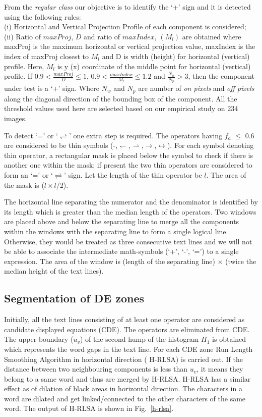 \documentclass[oneside,a4paper,12pt]{book}
\begin{document}
From the \emph{regular class} our objective is to identify the `+' sign
and it is detected using the following rules: \\
(i)  Horizontal and Vertical Projection Profile of each component is considered;\\
(ii) Ratio of  $maxProj$, $D$ and ratio of $maxIndex$, $(M_l)$
are obtained where maxProj is the maximum horizontal or vertical projection value, maxIndex is the index of maxProj closest to $M_l$ and D is width (height) for horizontal (vertical) profile. Here, $M_l$ is y (x) coordinate of the middle point for  horizontal (vertical) profile. 
If  $0.9 < \frac{maxProj}{D} \leq 1$,  $0.9 < \frac{maxIndex}{M_l} \leq 1.2$ and $\frac{N_w}{N_p} > 3$, then the component under test is a `+' sign.
Where $N_w$ and $N_p$ are number of \emph{on pixels} and \emph{off pixels} along the 
diagonal direction of the bounding box of the component. All the threshold values used  here are selected based on our empirical study on 234 images.


To detect `=' or `$\rightleftharpoons$' one extra step is required. 
The operators having $f_a$ $\leq$ 0.6 are considered to be thin symbols (-,$\leftharpoondown$,$\rightharpoonup$,$\rightarrow$,$\leftrightarrow$). 
 For each symbol denoting thin operator, a rectangular mask is placed below the
symbol to check if there is another one within the mask; if present the two thin operators are considered to form
an `=' or `$\rightleftharpoons$' sign. Let the length of the thin operator be $l$. The area of the  mask is  ($l \times l/2$).

The horizontal line separating  the numerator and the denominator is identified by its length which is greater than
the median length of the operators. Two windows are placed above and below  the separating line to merge all
the components within the windows with the separating line to form a single logical line. Otherwise, they would be
treated as three consecutive text lines and we will not be able to associate the intermediate math-symbols (`+', `-', `=')
 to a single expression. The area of the window is (length of the separating line) $\times$ (twice the median height of the text
lines).


\subsection{Segmentation of DE zones}
Initially, all the text lines consisting of at least one operator are considered as candidate displayed equations (CDE).
The operators are eliminated from CDE. The upper boundary ($u_v$) of the second hump of the histogram $H_1$ is obtained
which represents the word gaps in the text line. For each CDE zone Run Length Smoothing Algorithm  in horizontal direction (  H-RLSA) is 
carried out. If the distance between two neighbouring
components is less than $u_v$, it means they belong to a same word and thus are merged by H-RLSA.
H-RLSA has a similar effect as of dilation of black areas in horizontal direction. The characters
in a word are dilated and get linked/connected to the other characters of the same word. The output of
H-RLSA is shown in Fig.~\ref{h-rlsa}.
\end{document}
